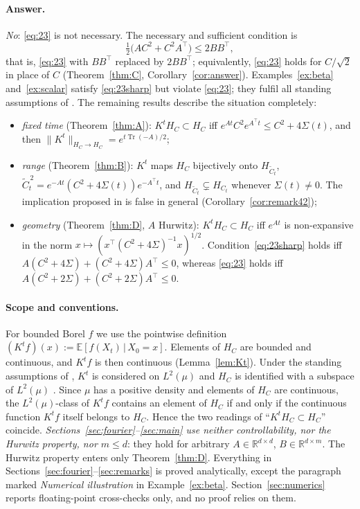 \documentclass[11pt]{article}
\theoremstyle{definition}
\theoremstyle{remark}
\newcommand{\R}{\mathbb{R}}
\newcommand{\Tr}{\operatorname{Tr}}
\newcommand{\Ct}{\widetilde{C}_t}
\newcommand{\tp}{\top}
\begin{document}
\paragraph{Answer.}
\emph{No}: \eqref{eq:23} is not necessary. The necessary and sufficient condition is
\begin{equation}\tag{2.3$^\sharp$}\label{eq:23sharp}
\tfrac12\bigl(AC^2+C^2A^\tp\bigr)\le 2BB^\tp ,
\end{equation}
that is, \eqref{eq:23} with $BB^\tp$ replaced by $2BB^\tp$; equivalently, \eqref{eq:23} holds for $C/\sqrt2$ in place
of $C$ (Theorem~\ref{thm:C}, Corollary~\ref{cor:answer}). Examples~\ref{ex:beta} and~\ref{ex:scalar} satisfy
\eqref{eq:23sharp} but violate \eqref{eq:23}; they fulfil all standing assumptions of \cite{PSWPN}. The remaining
results describe the situation completely:
\begin{itemize}
\item \emph{fixed time} (Theorem~\ref{thm:A}): $K^tH_C\subset H_C$ iff $e^{At}C^2e^{A^\tp t}\le C^2+4\Sigma(t)$, and then
$\|K^t\|_{H_C\to H_C}=e^{t\Tr(-A)/2}$;
\item \emph{range} (Theorem~\ref{thm:B}): $K^t$ maps $H_C$ bijectively onto $H_{\Ct}$,
$\Ct^{\,2}=e^{-At}(C^2+4\Sigma(t))e^{-A^\tp t}$, and $H_{\Ct}\subsetneq H_{C_t}$ whenever $\Sigma(t)\neq0$. The
implication proposed in \cite[Remark~4.2]{PSWPN} is false in general (Corollary~\ref{cor:remark42});
\item \emph{geometry} (Theorem~\ref{thm:D}, $A$ Hurwitz): $K^tH_C\subset H_C$ iff $e^{At}$ is non-expansive in the
norm $x\mapsto(x^\tp(C^2+4\Sigma)^{-1}x)^{1/2}$. Condition~\eqref{eq:23sharp} holds iff
$A(C^2+4\Sigma)+(C^2+4\Sigma)A^\tp\le0$, whereas \eqref{eq:23} holds iff $A(C^2+2\Sigma)+(C^2+2\Sigma)A^\tp\le 0$.
\end{itemize}

\paragraph{Scope and conventions.}
For bounded Borel $f$ we use the pointwise definition $(K^tf)(x):=\mathbb E[f(X_t)\,|\,X_0=x]$. Elements of $H_C$ are
bounded and continuous, and $K^tf$ is then continuous (Lemma~\ref{lem:Kt}). Under the standing assumptions of
\cite{PSWPN}, $K^t$ is considered on $L^2(\mu)$ and $H_C$ is identified with a subspace of $L^2(\mu)$
\cite[Lemma~3.1]{PSWPN}. Since $\mu$ has a positive density and elements of $H_C$ are continuous, the
$L^2(\mu)$-class of $K^tf$ contains an element of $H_C$ if and only if the continuous function $K^tf$ itself
belongs to $H_C$. Hence the two readings of ``$K^tH_C\subset H_C$'' coincide. \emph{Sections~\ref{sec:fourier}--\ref{sec:main}
use neither controllability, nor the Hurwitz property, nor $m\le d$}: they hold for arbitrary $A\in\R^{d\times d}$, $B\in\R^{d\times m}$.
The Hurwitz property enters only Theorem~\ref{thm:D}. Everything in Sections~\ref{sec:fourier}--\ref{sec:remarks}
is proved analytically, except the paragraph marked \emph{Numerical illustration} in Example~\ref{ex:beta}.
Section~\ref{sec:numerics} reports floating-point cross-checks only, and no proof relies on them.
\end{document}

